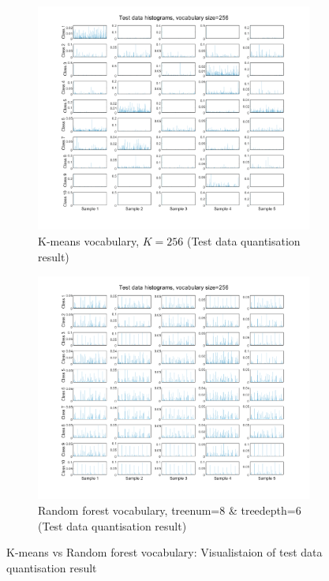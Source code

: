 \begin{figure}[htbp]
	\centering
	\begin{subfigure}[t]{0.5\linewidth}
		\centering
		\includegraphics[height=7.5cm]{image/q3-appendix/Kmtest-256.png} 
		\caption{K-means vocabulary, $K=256$ (Test data quantisation result)}
	\end{subfigure}%
	\hfill
	\begin{subfigure}[t]{0.5\linewidth}
		\centering
		\includegraphics[height=7.5cm]{image/q3-appendix/RFtest-256.png}
		\caption{Random forest vocabulary, treenum=8 \& treedepth=6 (Test data quantisation result)}
	\end{subfigure}
	
	\caption{K-means vs Random forest vocabulary: Visualistaion of test data quantisation result}
	\label{fig:q3_histogram_te}
\end{figure}

